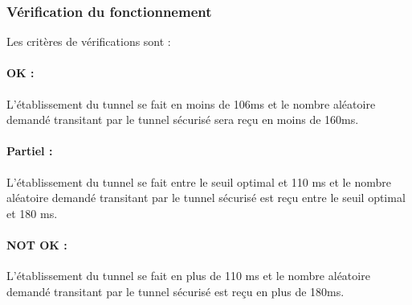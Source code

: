 \documentclass[a4paper,11pt,french]{article}
\begin{document}
\subsubsection{Vérification du fonctionnement}
	Les critères de vérifications sont :
\paragraph{OK : } L'établissement du tunnel se fait en moins de 106ms et le
nombre aléatoire demandé transitant par le tunnel sécurisé sera reçu en
moins de 160ms.
\paragraph{Partiel : } L'établissement du tunnel se fait entre le
seuil optimal et 110 ms et le nombre aléatoire demandé transitant par le
tunnel sécurisé est reçu entre le seuil optimal et 180 ms.
\paragraph{NOT OK : } L'établissement du tunnel se fait en plus de 110 ms
et le nombre aléatoire demandé transitant par le tunnel sécurisé est reçu
en plus de 180ms.
\end{document}
